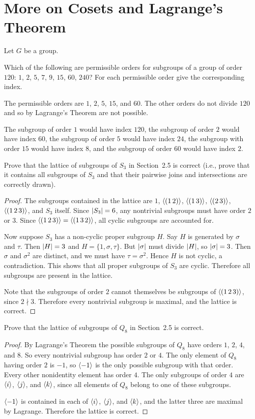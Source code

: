 \section{More on Cosets and Lagrange's Theorem}

Let $G$ be a group.

 Which of the following are permissible orders for subgroups
of a group of order $120$: $1$, $2$, $5$, $7$, $9$, $15$, $60$, $240$?
For each permissible order give the corresponding index.
\begin{solution}
  The permissible orders are $1$, $2$, $5$, $15$, and $60$. The other
  orders do not divide $120$ and so by Lagrange's Theorem are not
  possible.

  The subgroup of order $1$ would have index $120$, the subgroup of
  order $2$ would have index $60$, the subgroup of order $5$ would
  have index $24$, the subgroup with order $15$ would have index $8$,
  and the subgroup of order $60$ would have index $2$.
\end{solution}

 Prove that the lattice of subgroups of $S_3$ in Section~2.5
is correct (i.e., prove that it contains all subgroups of $S_3$ and
that their pairwise joins and intersections are correctly drawn).
\begin{proof}
  The subgroups contained in the lattice are $1$, $\langle{(1\,2)}\rangle$,
  $\langle{(1\,3)}\rangle$, $\langle{(2\,3)}\rangle$, $\langle{(1\,2\,3)}\rangle$, and $S_3$
  itself. Since $\lvert{S_3}\rvert = 6$, any nontrivial subgroups must have
  order $2$ or $3$. Since $\langle{(1\,2\,3)}\rangle = \langle{(1\,3\,2)}\rangle$, all
  cyclic subgroups are accounted for.

  Now suppose $S_3$ has a non-cyclic proper subgroup $H$. Say $H$ is
  generated by $\sigma$ and $\tau$. Then $\lvert{H}\rvert = 3$ and
  $H = \{1, \sigma, \tau\}$. But $\lvert{\sigma}\rvert$ must divide $\lvert{H}\rvert$,
  so $\lvert{\sigma}\rvert = 3$. Then $\sigma$ and $\sigma^2$ are distinct,
  and we must have $\tau = \sigma^2$. Hence $H$ is not cyclic, a
  contradiction. This shows that all proper subgroups of $S_3$ are
  cyclic. Therefore all subgroups are present in the lattice.

  Note that the subgroups of order $2$ cannot themselves be subgroups
  of $\langle{(1\,2\,3)}\rangle$, since $2\nmid3$. Therefore every nontrivial
  subgroup is maximal, and the lattice is correct.
\end{proof}

 Prove that the lattice of subgroups of $Q_8$ in Section~2.5
is correct.
\begin{proof}
  By Lagrange's Theorem the possible subgroups of $Q_8$ have orders
  $1$, $2$, $4$, and $8$. So every nontrivial subgroup has order $2$
  or $4$. The only element of $Q_8$ having order $2$ is $-1$, so
  $\langle{-1}\rangle$ is the only possible subgroup with that order. Every
  other nonidentity element has order $4$. The only subgroups of order
  $4$ are $\langle{i}\rangle$, $\langle{j}\rangle$, and $\langle{k}\rangle$, since all elements of
  $Q_8$ belong to one of these subgroups.

  $\langle{-1}\rangle$ is contained in each of $\langle{i}\rangle$, $\langle{j}\rangle$, and
  $\langle{k}\rangle$, and the latter three are maximal by Lagrange. Therefore
  the lattice is correct.
\end{proof}


